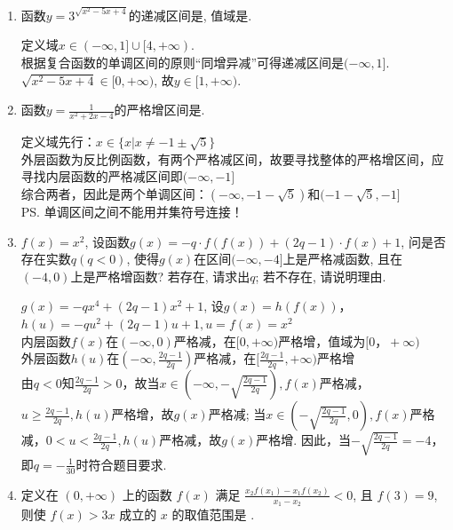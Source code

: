 \begin{enumerate}
    \item 函数$y=3^{\sqrt{x^2-5x+4}}$的递减区间是\blkda{$(-\infty,1]$}, 值域是\blkda{$[1,+\infty)$}. 
    \begin{jieda}
    定义域$x\in(-\infty,1]\cup[4,+\infty)$. \\
    根据复合函数的单调区间的原则``同增异减''可得递减区间是$(-\infty,1]$. \\
    $\sqrt{x^2-5x+4}\in[0,+\infty)$, 故$y\in[1,+\infty)$. 
    \end{jieda}
    \item 函数$y = \frac{1}{x^2+2x-4}$的严格增区间是\blkda[5]{$(-\infty,-1-\sqrt{5})$和$(-1-\sqrt{5}, -1]$}. 
    \begin{jieda}
        定义域先行：$x \in \{x | x \neq -1\pm \sqrt{5}\}$ \\
        外层函数为反比例函数，有两个严格减区间，故要寻找整体的严格增区间，应寻找内层函数的严格减区间即$(-\infty,-1]$ \\
        综合两者，因此是两个单调区间：$(-\infty,-1-\sqrt{5})$和$(-1-\sqrt{5}, -1]$ \\
        \ps 单调区间之间不能用并集符号连接！
    \end{jieda}
    \item $f(x)   = x^2$, 设函数$g(x)=-q\cdot f(f(x))+(2q-1)\cdot f(x)+1$, 问是否存在实数$q(q<0)$, 
    使得$g(x)$在区间$(-\infty,-4]$上是严格减函数, 且在$(-4,0)$上是严格增函数? 若存在, 请求出$q$; 若不存在, 请说明理由.
    \begin{jieda}
    $g(x)=-qx^4+(2q-1)x^2+1$, 设$g(x) = h(f(x))$，$h(u) = -qu^2 + (2q-1)u + 1, u = f(x) = x^2$ \\
    内层函数$f(x)$在$(-\infty, 0)$严格减，在$[0, +\infty)$严格增，值域为$[0， +\infty)$ \\
    外层函数$h(u)$在$(-\infty, \frac{2q-1}{2q})$严格减，在$[\frac{2q-1}{2q}, +\infty)$严格增 \\
    由$q < 0$知$\frac{2q-1}{2q} > 0$，故当$x \in (-\infty, -\sqrt{\frac{2q-1}{2q}}), f(x)$严格减，$u \geq \frac{2q-1}{2q}, h(u)$严格增，故$g(x)$严格减; 当$x \in (-\sqrt{\frac{2q-1}{2q}}, 0), f(x)$严格减，$0 < u < \frac{2q-1}{2q}, h(u)$严格减，故$g(x)$严格增. 因此，当$-\sqrt{\frac{2q-1}{2q}} = -4$，即$q=-\frac{1}{30}$时符合题目要求. 
    \end{jieda}
    \item 定义在 $(0,+\infty)$ 上的函数 $f(x)$ 满足 $\frac{x_{2} f\left(x_{1}\right)-x_{1} f\left(x_{2}\right)}{x_{1}-x_{2}}<0$, 且 $f(3)=9$, 则使 $f(x)>3 x$ 成立的 $x$ 的取值范围是 .
    \begin{jieda}

\end{jieda}
\end{enumerate}
